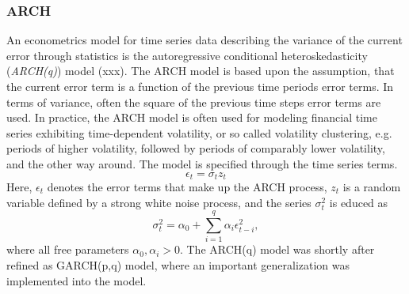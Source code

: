 \subsubsection{ARCH}
An econometrics model for time series data describing the variance of the current error through statistics is the autoregressive conditional heteroskedasticity (\textit{ARCH(q)}) model (xxx). The ARCH model is based upon the assumption, that the current error term is a function of the previous time periods error terms. In terms of variance, often the square of the previous time steps error terms are used. In practice, the ARCH model is often used for modeling financial time series exhibiting time-dependent volatility, or so called volatility clustering, e.g. periods of higher volatility, followed by periods of comparably lower volatility, and the other way around. The model is specified through the time series terms.
\begin{equation}
	\epsilon_t = \sigma_t z_t
\label{eq: ARCH process}
\end{equation}
Here, $\epsilon_t$ denotes the error terms that make up the ARCH process, $z_t$ is a random variable defined by a strong white noise process, and the series $\sigma_t^2$ is educed as 
\begin{equation}
	\sigma_t^2 = \alpha_0 + \sum_{i=1}^{q}\alpha_i \epsilon_{t-i}^2,
\label{eq: ARCH sigma series}
\end{equation}
where all free parameters $\alpha_0, \alpha_i > 0$. The ARCH(q) model was shortly after refined as GARCH(p,q) model, where an important generalization was implemented into the model. 

